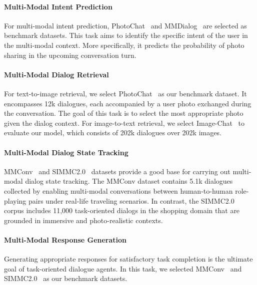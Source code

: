 \documentclass[11pt]{article}
\begin{document}
\paragraph{Multi-Modal Intent Prediction}
For multi-modal intent prediction,  PhotoChat~\citep{zang2021photochat} and MMDialog~\citep{feng2022mmdialog} are selected as benchmark datasets.
This task aims to identify the specific intent of the user in the multi-modal context. More specifically, it predicts the probability of photo sharing in the upcoming conversation turn.

\paragraph{Multi-Modal Dialog Retrieval} 
For text-to-image retrieval, we select PhotoChat~\citep{zang2021photochat} as our benchmark dataset. It encompasses 12k dialogues, each accompanied by a user photo exchanged during the conversation. The goal of this task is to select the most appropriate photo given the dialog context. For image-to-text retrieval, we select Image-Chat~\citep{shuster2018image} to evaluate our model, which consists of 202k dialogues over 202k images. 


\paragraph{Multi-Modal Dialog State Tracking}
MMConv~\citep{liao2021mmconv} and SIMMC2.0~\citep{kottur2021simmc} datasets provide a good base for carrying out multi-modal dialog state tracking. The MMConv dataset contains 5.1k dialogues collected by enabling multi-modal conversations between human-to-human role-playing pairs under real-life traveling scenarios. In contrast, the SIMMC2.0 corpus includes 11,000 task-oriented dialogs in the shopping domain that are grounded in immersive and photo-realistic contexts.

\paragraph{Multi-Modal Response Generation}
Generating appropriate responses for satisfactory task completion is the ultimate goal of task-oriented dialogue agents. In this task, we selected MMConv~\citep{liao2021mmconv} and SIMMC2.0~\citep{kottur2021simmc} as our benchmark datasets.
\end{document}
